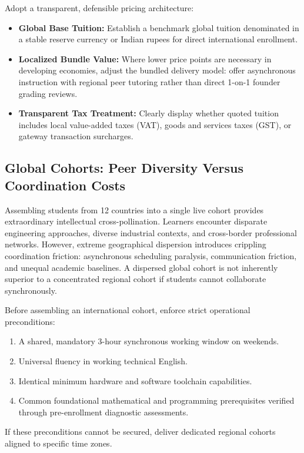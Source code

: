 Adopt a transparent, defensible pricing architecture:
\begin{itemize}
\item \textbf{Global Base Tuition:} Establish a benchmark global tuition denominated in a stable reserve currency or Indian rupees for direct international enrollment.
\item \textbf{Localized Bundle Value:} Where lower price points are necessary in developing economies, adjust the bundled delivery model: offer asynchronous instruction with regional peer tutoring rather than direct 1-on-1 founder grading reviews.
\item \textbf{Transparent Tax Treatment:} Clearly display whether quoted tuition includes local value-added taxes (VAT), goods and services taxes (GST), or gateway transaction surcharges.
\end{itemize}

\subsection{Global Cohorts: Peer Diversity Versus Coordination Costs}
\label{sec:global_cohorts_diversity_versus_coordination}

Assembling students from 12 countries into a single live cohort provides extraordinary intellectual cross-pollination. Learners encounter disparate engineering approaches, diverse industrial contexts, and cross-border professional networks. However, extreme geographical dispersion introduces crippling coordination friction: asynchronous scheduling paralysis, communication friction, and unequal academic baselines. A dispersed global cohort is not inherently superior to a concentrated regional cohort if students cannot collaborate synchronously.

Before assembling an international cohort, enforce strict operational preconditions:
\begin{enumerate}
\item A shared, mandatory 3-hour synchronous working window on weekends.
\item Universal fluency in working technical English.
\item Identical minimum hardware and software toolchain capabilities.
\item Common foundational mathematical and programming prerequisites verified through pre-enrollment diagnostic assessments.
\end{enumerate}
If these preconditions cannot be secured, deliver dedicated regional cohorts aligned to specific time zones.

